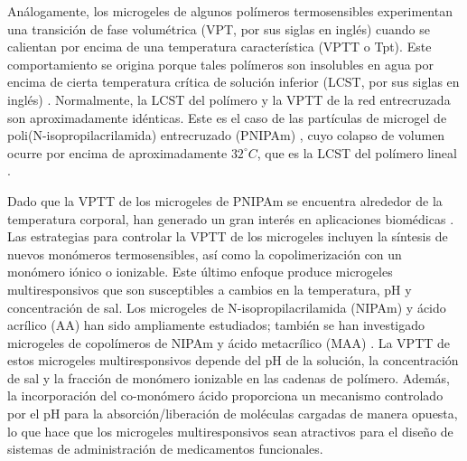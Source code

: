An\'alogamente, los microgeles de algunos pol\'imeros termosensibles experimentan una transici\'on de fase volum\'etrica (VPT, por sus siglas en ingl\'es) cuando se calientan por encima de una temperatura caracter\'istica (VPTT o Tpt)\cite{Pelton1986,Pelton2000}.
Este comportamiento se origina porque tales pol\'imeros son insolubles en agua por encima de cierta temperatura cr\'itica de soluci\'on inferior (LCST, por sus siglas en ingl\'es) \cite{Kawaguchi2020}.
Normalmente, la LCST del pol\'imero y la VPTT de la red entrecruzada son aproximadamente id\'enticas.
Este es el caso de las part\'iculas de microgel de poli(N-isopropilacrilamida) entrecruzado (PNIPAm) \cite{Pelton1986}, cuyo colapso de volumen ocurre por encima de aproximadamente $32 ^\circ C$, que es la LCST del pol\'imero lineal \cite{Schild1992}.

Dado que la VPTT de los microgeles de PNIPAm se encuentra alrededor de la temperatura corporal, han generado un gran inter\'es en aplicaciones biom\'edicas \cite{Guan2011}.
Las estrategias para controlar la VPTT de los microgeles incluyen la s\'intesis de nuevos mon\'omeros termosensibles\cite{Cai2007,Macchione2019}, as\'i como la copolimerizaci\'on con un mon\'omero i\'onico o ionizable\cite{Hirose1987,Lopez2020}.
Este \'ultimo enfoque produce microgeles multiresponsivos que son susceptibles a cambios en la temperatura, pH y concentraci\'on de sal\cite{snowden1996colloidal,Farooqi2017}.
Los microgeles de N-isopropilacrilamida (NIPAm) y \'acido acr\'ilico (AA) han sido ampliamente estudiados\cite{Morris1997,Jones2000,Bradley2005,Begum2016}; tambi\'en se han investigado microgeles de copol\'imeros de NIPAm y \'acido metacr\'ilico (MAA) \cite{Dowding2000,Hoare2004,Giussi2015}.
La VPTT de estos microgeles multiresponsivos depende del pH de la soluci\'on, la concentraci\'on de sal y la fracci\'on de mon\'omero ionizable en las cadenas de pol\'imero\cite{Morris1997,Jones2000,Hoare2004,Bradley2005,Lee2008,Wong2009,Hamzavi2016}.
Adem\'as, la incorporaci\'on del co-mon\'omero \'acido proporciona un mecanismo controlado por el pH para la absorci\'on/liberaci\'on de mol\'eculas cargadas de manera opuesta, lo que hace que los microgeles multiresponsivos sean atractivos para el dise\~no de sistemas de administraci\'on de medicamentos funcionales\cite{Liu2017}.

